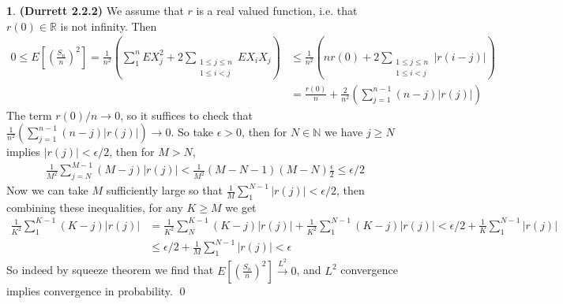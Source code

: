 \documentclass[10.5pt]{article}
\theoremstyle{definition}
\newtheorem{pb}{}
\newcommand{\abs}[1]{\lvert#1\rvert}
\begin{document}
    \begin{pb}\textbf{(Durrett 2.2.2)}
        We assume that \(r\) is a real valued function, i.e. that \(r(0) \in \mathbb{R}\) is not infinity. Then
        \begin{align*}
            0 \leq E\left[\left(\frac{S_n}{n}\right)^2\right] = \frac{1}{n^2}\left(\sum_1^n E X_j^2 + 2\sum_{\substack{1 \leq j \leq n \\ 1 \leq i < j}}EX_iX_j\right) &\leq \frac{1}{n^2}\left(nr(0) + 2\sum_{\substack{1 \leq j \leq n \\ 1 \leq i < j}}\abs{r(i-j)}\right) \\ &= \frac{r(0)}{n} + \frac{2}{n^2}\left(\sum_{j=1}^{n-1}(n-j)\abs{r(j)}\right)
        \end{align*}
        The term \(r(0)/n \to 0\), so it suffices to check that \(\frac{1}{n^2}\left(\sum_{j=1}^{n-1}(n-j)\abs{r(j)}\right) \to 0\). So take \(\epsilon > 0\), then for \(N \in \mathbb{N}\) we have \(j \geq N\) implies \(\abs{r(j)} < \epsilon/2\), then for \(M > N\),
        \begin{align*}
            \frac{1}{M^2}\sum_{j=N}^{M-1}(M-j)\abs{r(j)} < \frac{1}{M^2}(M-N-1)(M-N) \frac{\epsilon}{2} \leq \epsilon/2
        \end{align*}
        Now we can take \(M\) sufficiently large so that \(\frac{1}{M}\sum_1^{N-1}\abs{r(j)} < \epsilon/2\), then combining these inequalities, for any \(K \geq M\) we get
        \begin{align*}
            \frac{1}{K^2}\sum_1^{K-1}(K-j)\abs{r(j)} &= \frac{1}{K^2}\sum_N^{K-1}(K-j)\abs{r(j)} + \frac{1}{K^2}\sum_1^{N-1}(K-j)\abs{r(j)} < \epsilon/2 + \frac{1}{K}\sum_1^{N-1}\abs{r(j)} \\
            & \leq \epsilon/2 + \frac{1}{M}\sum_1^{N-1}\abs{r(j)} < \epsilon
        \end{align*}
        So indeed by squeeze theorem we find that \(E\left[\left(\frac{S_n}{n}\right)^2\right] \overset{L^2}{\to} 0\), and \(L^2\) convergence implies convergence in probability. \qed
    \end{pb}
\end{document}
